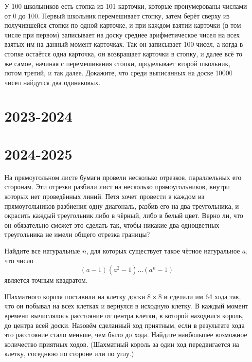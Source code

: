 \documentclass[11pt, a4paper]{problems_template}
\begin{document}
\begin{exercise}
У 100 школьников есть стопка из 101 карточки, которые пронумерованы числами от 0 до 100. Первый школьник перемешивает стопку, затем берёт сверху из получившейся стопки по одной карточке, и при каждом взятии карточки (в том числе при первом) записывает на доску среднее арифметическое чисел на всех взятых им на данный момент карточках. Так он записывает 100 чисел, а когда в стопке остаётся одна карточка, он возвращает карточки в стопку, и далее всё то же самое, начиная с перемешивания стопки,
проделывает второй школьник, потом третий, и так далее. Докажите, что среди выписанных на доске 10000 чисел найдутся два одинаковых.
\end{exercise}

\chapter{2023-2024}

\begin{exercise}

\end{exercise}



\chapter{2024-2025}

\begin{exercise}
На прямоугольном листе бумаги провели несколько отрезков, параллельных его сторонам. Эти отрезки разбили лист на несколько прямоугольников, внутри которых нет проведённых линий. Петя хочет провести в каждом из прямоугольников разбиения одну диагональ, разбив его на два треугольника, и окрасить каждый треугольник либо в чёрный, либо в белый цвет. Верно ли, что он обязательно сможет это сделать так, чтобы никакие два одноцветных треугольника не имели общего отрезка границы?
\end{exercise}

\begin{Solution}
\end{Solution}

\begin{exercise}
Найдите все натуральные $n$, для которых существует такое чётное натуральное $a$, что число 
$$
(a - 1)(a^{2} - 1)\dots(a^{n} - 1)
$$ 
является точным квадратом.
\end{exercise}

\begin{exercise}
Шахматного короля поставили на клетку доски $8 \times 8$ и сделали им 64 хода так, что он побывал на всех клетках и вернулся в исходную клетку. В каждый момент времени вычислялось расстояние от центра клетки, в которой находился король, до центра всей доски. Назовём сделанный ход приятным, если в результате хода это расстояние стало меньше, чем было до хода. Найдите наибольшее возможное
количество приятных ходов. (Шахматный король за один ход передвигается на клетку, соседнюю по стороне или по углу.)
\end{exercise}
\end{document}
